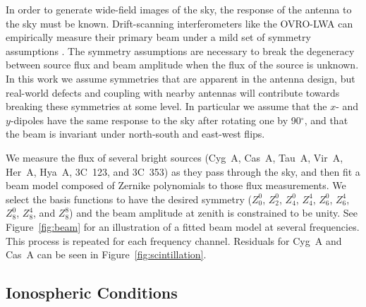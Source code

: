 \documentclass[twocolumn]{aastex61}
\begin{document}
In order to generate wide-field images of the sky, the response of the antenna to the sky must be
known. Drift-scanning interferometers like the OVRO-LWA can empirically measure their primary beam
under a mild set of symmetry assumptions \citep{2012AJ....143...53P}. The symmetry assumptions are
necessary to break the degeneracy between source flux and beam amplitude when the flux of the source
is unknown. In this work we assume symmetries that are apparent in the antenna design, but
real-world defects and coupling with nearby antennas will contribute towards breaking these
symmetries at some level. In particular we assume that the $x$- and $y$-dipoles have the same
response to the sky after rotating one by 90$^\circ$, and that the beam is invariant under
north-south and east-west flips.

We measure the flux of several bright sources (Cyg~A, Cas~A, Tau~A, Vir~A, Her~A, Hya~A, 3C~123, and
3C~353) as they pass through the sky, and then fit a beam model composed of Zernike polynomials to
those flux measurements. We select the basis functions to have the desired symmetry ($Z_0^0$,
$Z_2^0$, $Z_4^0$, $Z_4^4$, $Z_6^0$, $Z_6^4$, $Z_8^0$, $Z_8^4$, and $Z_8^8$) and the beam amplitude
at zenith is constrained to be unity. See Figure~\ref{fig:beam} for an illustration of a fitted beam
model at several frequencies. This process is repeated for each frequency channel. Residuals for
Cyg~A and Cas~A can be seen in Figure~\ref{fig:scintillation}.

\subsection{Ionospheric Conditions}
\end{document}
